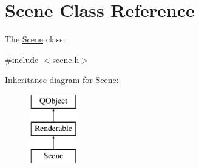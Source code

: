 \hypertarget{class_scene}{}\section{Scene Class Reference}
\label{class_scene}


The \hyperlink{class_scene}{Scene} class.  




{\ttfamily \#include $<$scene.\+h$>$}

Inheritance diagram for Scene\+:\begin{figure}[H]
\begin{center}
\leavevmode
\includegraphics[height=3.000000cm]{class_scene}
\end{center}
\end{figure}

